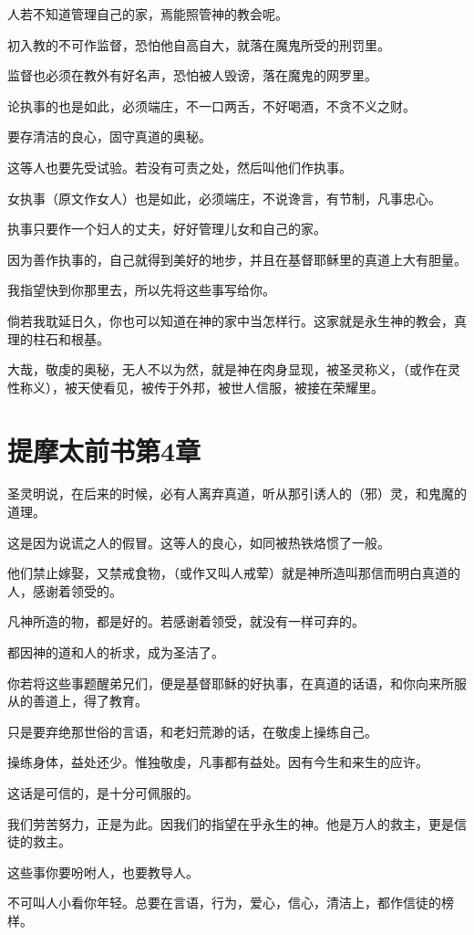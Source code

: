 \documentclass[12pt,oneside]{book}
\begin{document}
人若不知道管理自己的家，焉能照管神的教会呢。

初入教的不可作监督，恐怕他自高自大，就落在魔鬼所受的刑罚里。

监督也必须在教外有好名声，恐怕被人毁谤，落在魔鬼的网罗里。

论执事的也是如此，必须端庄，不一口两舌，不好喝酒，不贪不义之财。

要存清洁的良心，固守真道的奥秘。

这等人也要先受试验。若没有可责之处，然后叫他们作执事。

女执事（原文作女人）也是如此，必须端庄，不说谗言，有节制，凡事忠心。

执事只要作一个妇人的丈夫，好好管理儿女和自己的家。

因为善作执事的，自己就得到美好的地步，并且在基督耶稣里的真道上大有胆量。

我指望快到你那里去，所以先将这些事写给你。

倘若我耽延日久，你也可以知道在神的家中当怎样行。这家就是永生神的教会，真理的柱石和根基。

大哉，敬虔的奥秘，无人不以为然，就是神在肉身显现，被圣灵称义，（或作在灵性称义），被天使看见，被传于外邦，被世人信服，被接在荣耀里。

\chapter{提摩太前书第4章}
圣灵明说，在后来的时候，必有人离弃真道，听从那引诱人的（邪）灵，和鬼魔的道理。

这是因为说谎之人的假冒。这等人的良心，如同被热铁烙惯了一般。

他们禁止嫁娶，又禁戒食物，（或作又叫人戒荤）就是神所造叫那信而明白真道的人，感谢着领受的。

凡神所造的物，都是好的。若感谢着领受，就没有一样可弃的。

都因神的道和人的祈求，成为圣洁了。

你若将这些事题醒弟兄们，便是基督耶稣的好执事，在真道的话语，和你向来所服从的善道上，得了教育。

只是要弃绝那世俗的言语，和老妇荒渺的话，在敬虔上操练自己。

操练身体，益处还少。惟独敬虔，凡事都有益处。因有今生和来生的应许。

这话是可信的，是十分可佩服的。

我们劳苦努力，正是为此。因我们的指望在乎永生的神。他是万人的救主，更是信徒的救主。

这些事你要吩咐人，也要教导人。

不可叫人小看你年轻。总要在言语，行为，爱心，信心，清洁上，都作信徒的榜样。
\end{document}
